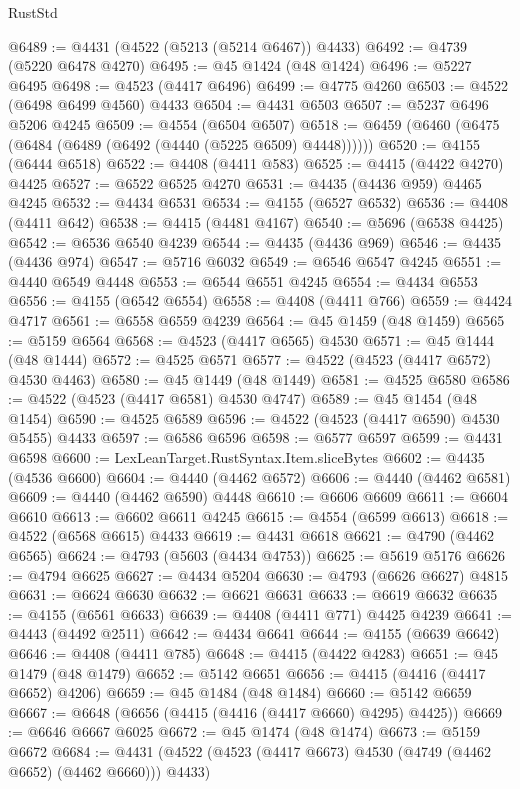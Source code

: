 \begin{lexlean}{RustStd}
\begin{coremodule}
{\begin{coremodule}
{{{{{{{{{{{{{{{{{{{{{{{{{{{{{{{{{{{{{{{{{{{{{{{{{{{{{{{{{{{{@6489 := @4431 (@4522 (@5213 (@5214 @6467)) @4433)
@6492 := @4739 (@5220 @6478 @4270)
@6495 := @45 @1424 (@48 @1424)
@6496 := @5227 @6495
@6498 := @4523 (@4417 @6496)
@6499 := @4775 @4260
@6503 := @4522 (@6498 @6499 @4560) @4433
@6504 := @4431 @6503
@6507 := @5237 @6496 @5206 @4245
@6509 := @4554 (@6504 @6507)
@6518 := @6459 (@6460 (@6475 (@6484 (@6489 (@6492 (@4440 (@5225 @6509) @4448))))))
@6520 := @4155 (@6444 @6518)
@6522 := @4408 (@4411 @583)
@6525 := @4415 (@4422 @4270) @4425
@6527 := @6522 @6525 @4270
@6531 := @4435 (@4436 @959) @4465 @4245
@6532 := @4434 @6531
@6534 := @4155 (@6527 @6532)
@6536 := @4408 (@4411 @642)
@6538 := @4415 (@4481 @4167)
@6540 := @5696 (@6538 @4425)
@6542 := @6536 @6540 @4239
@6544 := @4435 (@4436 @969)
@6546 := @4435 (@4436 @974)
@6547 := @5716 @6032
@6549 := @6546 @6547 @4245
@6551 := @4440 @6549 @4448
@6553 := @6544 @6551 @4245
@6554 := @4434 @6553
@6556 := @4155 (@6542 @6554)
@6558 := @4408 (@4411 @766)
@6559 := @4424 @4717
@6561 := @6558 @6559 @4239
@6564 := @45 @1459 (@48 @1459)
@6565 := @5159 @6564
@6568 := @4523 (@4417 @6565) @4530
@6571 := @45 @1444 (@48 @1444)
@6572 := @4525 @6571
@6577 := @4522 (@4523 (@4417 @6572) @4530 @4463)
@6580 := @45 @1449 (@48 @1449)
@6581 := @4525 @6580
@6586 := @4522 (@4523 (@4417 @6581) @4530 @4747)
@6589 := @45 @1454 (@48 @1454)
@6590 := @4525 @6589
@6596 := @4522 (@4523 (@4417 @6590) @4530 @5455) @4433
@6597 := @6586 @6596
@6598 := @6577 @6597
@6599 := @4431 @6598
@6600 := LexLeanTarget.RustSyntax.Item.sliceBytes
@6602 := @4435 (@4536 @6600)
@6604 := @4440 (@4462 @6572)
@6606 := @4440 (@4462 @6581)
@6609 := @4440 (@4462 @6590) @4448
@6610 := @6606 @6609
@6611 := @6604 @6610
@6613 := @6602 @6611 @4245
@6615 := @4554 (@6599 @6613)
@6618 := @4522 (@6568 @6615) @4433
@6619 := @4431 @6618
@6621 := @4790 (@4462 @6565)
@6624 := @4793 (@5603 (@4434 @4753))
@6625 := @5619 @5176
@6626 := @4794 @6625
@6627 := @4434 @5204
@6630 := @4793 (@6626 @6627) @4815
@6631 := @6624 @6630
@6632 := @6621 @6631
@6633 := @6619 @6632
@6635 := @4155 (@6561 @6633)
@6639 := @4408 (@4411 @771) @4425 @4239
@6641 := @4443 (@4492 @2511)
@6642 := @4434 @6641
@6644 := @4155 (@6639 @6642)
@6646 := @4408 (@4411 @785)
@6648 := @4415 (@4422 @4283)
@6651 := @45 @1479 (@48 @1479)
@6652 := @5142 @6651
@6656 := @4415 (@4416 (@4417 @6652) @4206)
@6659 := @45 @1484 (@48 @1484)
@6660 := @5142 @6659
@6667 := @6648 (@6656 (@4415 (@4416 (@4417 @6660) @4295) @4425))
@6669 := @6646 @6667 @6025
@6672 := @45 @1474 (@48 @1474)
@6673 := @5159 @6672
@6684 := @4431 (@4522 (@4523 (@4417 @6673) @4530 (@4749 (@4462 @6652) (@4462 @6660))) @4433)
}}}}}}}}}}}}}}}}}}}}}}}}}}}}}}}}}}}}}}}}}}}}}}}}}}}}}}}}}}}}
\end{coremodule}}
\end{coremodule}
\end{lexlean}
